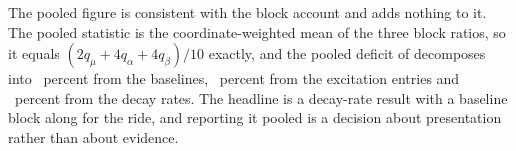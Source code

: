 The pooled figure is consistent with the block account and adds nothing to it. The
pooled statistic is the coordinate-weighted mean of the three block ratios, so it
equals $(2 q_\mu + 4 q_\alpha + 4 q_\beta)/10$ exactly, and the pooled deficit of
\ThPooledDeficit{} decomposes into \ThShareMu{}~percent from the baselines,
\ThShareAlpha{}~percent from the excitation entries and \ThShareBeta{}~percent from
the decay rates. The headline is a decay-rate result with a baseline block along
for the ride, and reporting it pooled is a decision about presentation rather than
about evidence.
